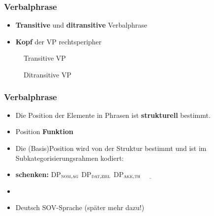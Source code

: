 \begin{frame}
\frametitle{Verbalphrase}

\begin{itemize}
	\item \textbf{Transitive} und \textbf{ditransitive} Verbalphrase
	\item \textbf{Kopf} der VP \ras rechtsperipher 
\end{itemize}

\begin{figure}[b]
	\begin{minipage}[b]{0.4\textwidth}
	\centering
		\caption{Transitive VP}	
  	\end{minipage} 
	\begin{minipage}[b]{0.52\textwidth}
	\centering
		\caption{Ditransitive VP}	
  	\end{minipage}
\end{figure}

\end{frame}


\begin{frame}
\frametitle{Verbalphrase}

\begin{itemize}
	\item Die Position der Elemente in Phrasen ist \textbf{strukturell} bestimmt.
	\item Position \ras \textbf{Funktion} 
	\item Die (Basis)Position wird von der Struktur bestimmt und ist im Subkategorisierungsrahmen kodiert:
	\item[] \textbf{schenken:} {\small DP$_{\textsc{nom,ag}}$ DP$_{\textsc{dat,ziel}}$  DP$_{\textsc{akk,th}}$ $\underline{\qquad}$ }
	\item[]
	\item Deutsch \ras SOV-Sprache (später mehr dazu!)
\end{itemize}

\end{frame}

